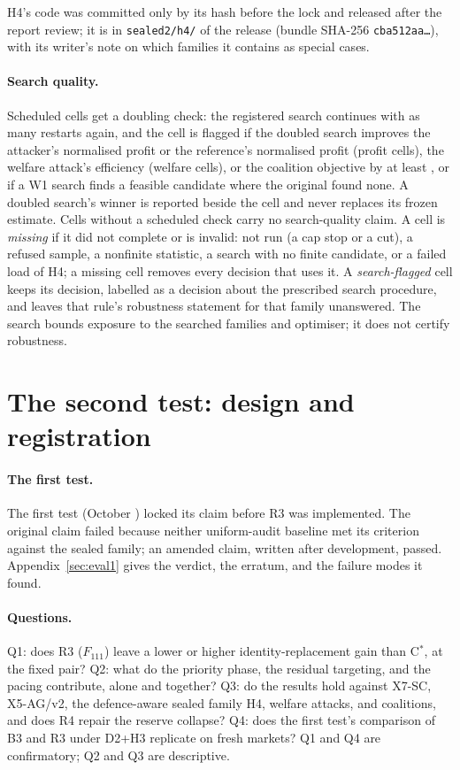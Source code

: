 \documentclass[11pt]{article}
\begin{document}
H4's code was committed only by its hash before the lock and released after the report review; it is in \texttt{sealed2/h4/} of the release (bundle SHA-256 \texttt{cba512aa\ldots}), with its writer's note on which families it contains as special cases.

\paragraph{Search quality.} Scheduled cells get a doubling check: the registered search continues with as many restarts again, and the cell is flagged if the doubled search improves the attacker's normalised profit or the reference's normalised profit (profit cells), the welfare attack's efficiency (welfare cells), or the coalition objective by at least , or if a W1 search finds a feasible candidate where the original found none. A doubled search's winner is reported beside the cell and never replaces its frozen estimate. Cells without a scheduled check carry no search-quality claim. A cell is \emph{missing} if it did not complete or is invalid: not run (a cap stop or a cut), a refused sample, a nonfinite statistic, a search with no finite candidate, or a failed load of H4; a missing cell removes every decision that uses it. A \emph{search-flagged} cell keeps its decision, labelled as a decision about the prescribed search procedure, and leaves that rule's robustness statement for that family unanswered. The search bounds exposure to the searched families and optimiser; it does not certify robustness.

\section{The second test: design and registration}\label{sec:design}
\paragraph{The first test.} The first test (October ) locked its claim before R3 was implemented. The original claim failed because neither uniform-audit baseline met its criterion against the sealed family; an amended claim, written after development, passed. Appendix~\ref{sec:eval1} gives the verdict, the erratum, and the failure modes it found.

\paragraph{Questions.} Q1: does R3 ($F_{111}$) leave a lower or higher identity-replacement gain than C$^*$, at the fixed pair? Q2: what do the priority phase, the residual targeting, and the pacing contribute, alone and together? Q3: do the results hold against X7-SC, X5-AG/v2, the defence-aware sealed family H4, welfare attacks, and coalitions, and does R4 repair the reserve collapse? Q4: does the first test's comparison of B3 and R3 under D2+H3 replicate on fresh markets? Q1 and Q4 are confirmatory; Q2 and Q3 are descriptive.
\end{document}
